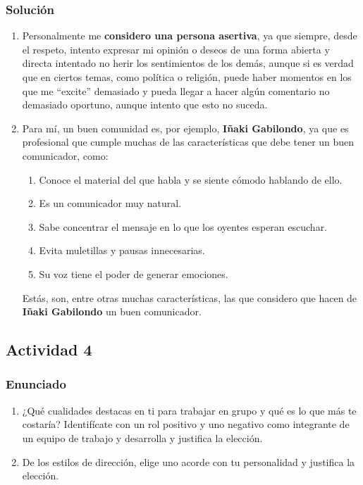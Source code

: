 \subsubsection{Solución}
\begin{enumerate}
    \item Personalmente me \textbf{considero una persona asertiva}, ya que siempre, desde el respeto, intento expresar mi opinión o deseos de una forma abierta y directa intentado no herir los sentimientos de los demás, aunque si es verdad que en ciertos temas, como política o religión, puede haber momentos en los que me ``excite'' demasiado y pueda llegar a hacer algún comentario no demasiado oportuno, aunque intento que esto no suceda.
    \item Para mí, un buen comunidad es, por ejemplo, \textbf{Iñaki Gabilondo}, ya que es profesional que cumple muchas de las características que debe tener un buen comunicador, como:

    \begin{enumerate}
        \item Conoce el material del que habla y se siente cómodo hablando de ello.
        \item Es un comunicador muy natural.
        \item Sabe concentrar el mensaje en lo que los oyentes esperan escuchar.
        \item Evita muletillas y pausas innecesarias.
        \item Su voz tiene el poder de generar emociones.
    \end{enumerate}

    Estás, son, entre otras muchas características, las que considero que hacen de \textbf{Iñaki Gabilondo} un buen comunicador.
\end{enumerate}

\subsection{Actividad 4}

\subsubsection{Enunciado}
\begin{enumerate}
    \item ¿Qué cualidades destacas en ti para trabajar en grupo y qué es lo que más te costaría? Identifícate con un rol positivo y uno negativo como integrante de un equipo de trabajo y desarrolla y justifica la elección.
    \item De los estilos de dirección, elige uno acorde con tu personalidad y justifica la elección.
\end{enumerate}

